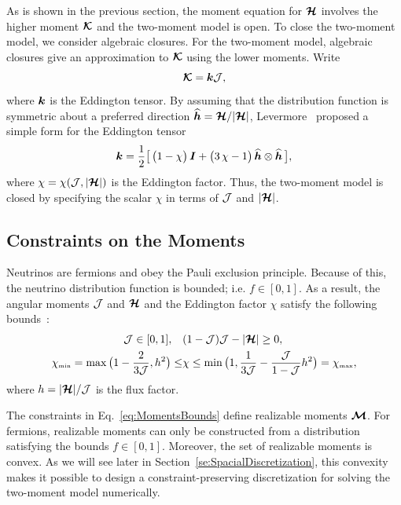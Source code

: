 As is shown in the previous section, the moment equation for $\boldsymbol{\mathcal{H}}$ involves the higher moment $\boldsymbol{\mathcal{K}}$ and the two-moment model is open.  
To close the two-moment model, we consider algebraic closures.  
For the two-moment model, algebraic closures give an approximation to $\boldsymbol{\mathcal{K}}$ using the lower moments.  
Write
\begin{equation}
  \boldsymbol{\mathcal{K}} = \boldsymbol{k} \mathcal{J},
\end{equation}
where $\boldsymbol{k}$ is the Eddington tensor.  
By assuming that the distribution function is symmetric about a preferred direction $\widehat{\boldsymbol{h}}=\boldsymbol{\mathcal{H}}/|\boldsymbol{\mathcal{H}}|$, Levermore~\cite{levermore_1984} proposed a simple form for the Eddington tensor
\begin{equation}
  \boldsymbol{k}=\frac{1}{2}\big[\,\big(1-\chi\big)\,\boldsymbol{I}+\big(3\,\chi-1\big)\,\widehat{\boldsymbol{h}}\otimes\widehat{\boldsymbol{h}}\,\big],
  \label{eq:eddingtonTensor}
\end{equation}
where $\chi=\chi(\mathcal{J},|\boldsymbol{\mathcal{H}}|)$ is the Eddington factor.  
Thus, the two-moment model is closed by specifying the scalar $\chi$ in terms of $\mathcal{J}$ and $|\boldsymbol{\mathcal{H}}|$.  

\subsection{Constraints on the Moments}

Neutrinos are fermions and obey the Pauli exclusion principle.  
Because of this, the neutrino distribution function is bounded; i.e. $f \in [0,1]$.
As a result, the angular moments $\mathcal{J}$ and $\boldsymbol{\mathcal{H}}$ and the Eddington factor $\chi$ satisfy the following bounds~\cite{levermore_1984,lareckiBanach_2011,kershaw_1976,shohatTamarkin_1943}: 
\begin{align}
\mathcal{J} \in[0,1], \quad &(1-\mathcal{J})\mathcal{J}-|\boldsymbol{\mathcal{H}}| \geq 0, \label{eq:MomentsBounds} \\
  \chi_{\mbox{\tiny min}}
  =\max\big(1-\frac{2}{3\mathcal{J}},h^{2}\big)
  \leq & \chi \leq \min\big(1,\frac{1}{3\mathcal{J}}-\frac{\mathcal{J}}{1-\mathcal{J}}h^{2}\big)=\chi_{\mbox{\tiny max}},
  \label{eq:eddingtonFactorBounds}
\end{align}
where $h = |\boldsymbol{\mathcal{H}}|/\mathcal{J}$ is the flux factor.  

The constraints in Eq.~\eqref{eq:MomentsBounds} define realizable moments $\boldsymbol{\mathcal{M}}$.  
For fermions, realizable moments can only be constructed from a distribution satisfying the bounds $f \in [0,1]$.  
Moreover, the set of realizable moments is convex.  
As we will see later in Section~\ref{se:SpacialDiscretization}, this convexity makes it possible to design a constraint-preserving discretization for solving the two-moment model numerically.

